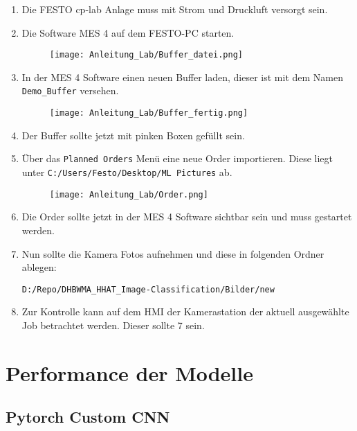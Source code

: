 \begin{enumerate} 
    \item Die FESTO \ac{cp-lab} Anlage muss mit Strom und Druckluft versorgt sein.
    \item Die Software MES 4 auf dem FESTO-PC starten.
    \begin{figure}[H]
        \centering
        \texttt{[image: Anleitung\_Lab/Buffer\_datei.png]}
    \end{figure}
    \item In der MES 4 Software einen neuen Buffer laden, dieser ist mit dem Namen \texttt{Demo\_Buffer} versehen.
    \begin{figure}[H]
        \centering
        \texttt{[image: Anleitung\_Lab/Buffer\_fertig.png]}
    \end{figure}
    \item Der Buffer sollte jetzt mit pinken Boxen gefüllt sein.
    \item Über das \texttt{Planned Orders} Menü eine neue Order importieren. Diese liegt unter \texttt{C:/Users/Festo/Desktop/ML Pictures} ab.

    \begin{figure}[H]
        \centering
        \texttt{[image: Anleitung\_Lab/Order.png]}
    \end{figure}

    \item Die Order sollte jetzt in der MES 4 Software sichtbar sein und muss gestartet werden.
    \item Nun sollte die Kamera Fotos aufnehmen und diese in folgenden Ordner ablegen:
    
    \texttt{D:/Repo/DHBWMA\_HHAT\_Image-Classification/Bilder/new}

    \item Zur Kontrolle kann auf dem HMI der Kamerastation der aktuell ausgewählte Job betrachtet werden. Dieser sollte 7 sein.

\end{enumerate}

\section{Performance der Modelle} \label{sec:performance_der_modelle}

\subsection{Pytorch Custom CNN}

